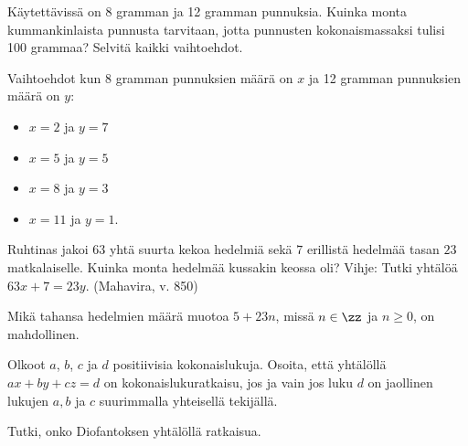 \begin{tehtava}
    Käytettävissä on 8 gramman ja 12 gramman punnuksia. Kuinka monta kummankinlaista punnusta tarvitaan, jotta punnusten kokonaismassaksi tulisi 100 grammaa? Selvitä kaikki vaihtoehdot.
    
    \begin{vastaus}
        Vaihtoehdot kun 8 gramman punnuksien määrä on $x$ ja 12 gramman punnuksien määrä on $y$:
        \begin{itemize}
            \item $x = 2$ ja $y = 7$
            \item $x = 5$ ja $y = 5$
            \item $x = 8$ ja $y = 3$
            \item $x = 11$ ja $y = 1$.
        \end{itemize}
    \end{vastaus}
    
\end{tehtava}

\begin{tehtava}
    Ruhtinas jakoi $63$ yhtä suurta kekoa hedelmiä sekä $7$ erillistä hedelmää tasan $23$ matkalaiselle. Kuinka monta hedelmää kussakin keossa oli? Vihje: Tutki yhtälöä $63x + 7 = 23y$. (Mahavira, v. 850)
    
    \begin{vastaus}
        Mikä tahansa hedelmien määrä muotoa $5 + 23n$, missä $n\in\zz$ ja $n\geq 0$, on mahdollinen.
    \end{vastaus}
    
\end{tehtava}

\begin{tehtava}
    Olkoot $a$, $b$, $c$ ja $d$ positiivisia kokonaislukuja. Osoita, että yhtälöllä $ax+by+cz=d$ on kokonaislukuratkaisu, jos ja vain jos luku $d$ on jaollinen lukujen $a, b$ ja $c$ suurimmalla yhteisellä tekijällä.
\end{tehtava}



\begin{tehtava}
    Tutki, onko Diofantoksen yhtälöllä ratkaisua.
    
    \begin{alakohdat}
    \end{alakohdat}

    \begin{vastaus}
        \begin{alakohdat}
        \end{alakohdat}
    \end{vastaus}
    
\end{tehtava}
